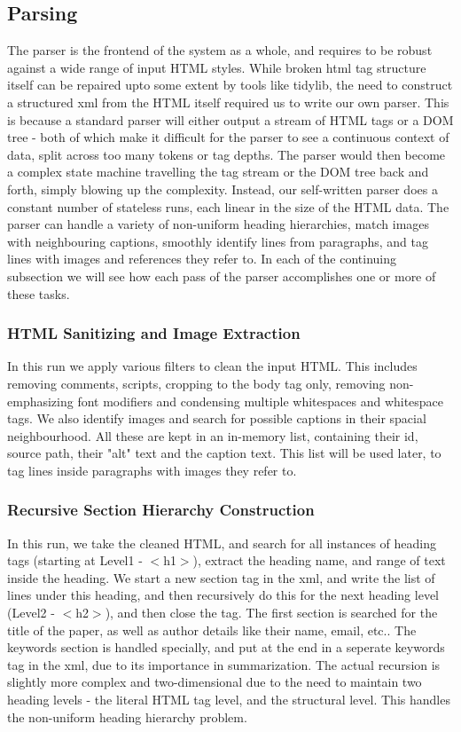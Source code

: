 \subsection{Parsing}

The parser is the frontend of the system as a whole, and requires to be robust
against a wide range of input HTML styles. While broken html tag structure
itself can be repaired upto some extent by tools like tidylib, the need to
construct a structured xml from the HTML itself required us to write our own
parser. This is because a standard parser will either output a stream of HTML
tags or a DOM tree - both of which make it difficult for the parser to see a
continuous context of data, split across too many tokens or tag depths. The
parser would then become a complex state machine travelling the tag stream or
the DOM tree back and forth, simply blowing up the complexity. Instead, our
self-written parser does a constant number of stateless runs, each linear in
the size of the HTML data. The parser can handle a variety of non-uniform heading
hierarchies, match images with neighbouring captions, smoothly identify lines from
paragraphs, and tag lines with images and references they refer to. In each of the
continuing subsection we will see how each pass of the parser accomplishes one or
more of these tasks.

\subsubsection{HTML Sanitizing and Image Extraction}

In this run we apply various filters to clean the input HTML. This includes
removing comments, scripts, cropping to the body tag only, removing non-emphasizing
font modifiers and condensing multiple whitespaces and whitespace tags.
We also identify images and search for possible captions in their spacial
neighbourhood. All these are kept in an in-memory list, containing their id, source
path, their "alt" text and the caption text. This list will be used later, to tag
lines inside paragraphs with images they refer to.

\subsubsection{Recursive Section Hierarchy Construction}

In this run, we take the cleaned HTML, and search for all instances of heading
tags (starting at Level1 - $<$h1$>$), extract the heading name, and range of text
inside the heading. We start a new section tag in the xml, and write the list of lines
under this heading, and then recursively do this for the next heading level (Level2 - $<$h2$>$),
and then close the tag. The first section is searched for the title of the paper, as well as
author details like their name, email, etc.. The keywords section is handled specially, and put
at the end in a seperate keywords tag in the xml, due to its importance in summarization.
The actual recursion is slightly more complex and two-dimensional due to the need to maintain
two heading levels - the literal HTML tag level, and the structural level. This handles the
non-uniform heading hierarchy problem.

